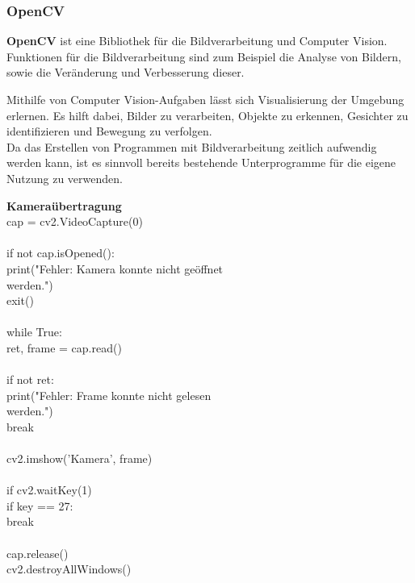 {\subsubsection{OpenCV}

\textbf{OpenCV} ist eine Bibliothek für die Bildverarbeitung und Computer Vision. Funktionen für die Bildverarbeitung sind zum Beispiel die Analyse von Bildern, sowie die Veränderung und Verbesserung dieser.

Mithilfe von Computer Vision-Aufgaben lässt sich Visualisierung der Umgebung erlernen. Es hilft dabei, Bilder zu verarbeiten, Objekte zu erkennen, Gesichter zu identifizieren und Bewegung zu verfolgen.\\
Da das Erstellen von Programmen mit Bildverarbeitung zeitlich aufwendig werden kann, ist es sinnvoll bereits bestehende Unterprogramme für die eigene Nutzung zu verwenden.\\

\newpage

\textbf{Kameraübertragung}\\

cap = cv2.VideoCapture(0)\\
\\
if not cap.isOpened():\\
print("Fehler: Kamera konnte nicht geöffnet\\ werden.")\\
exit()\\
\\
while True:\\
ret, frame = cap.read()\\
\\
if not ret:\\
print("Fehler: Frame konnte nicht gelesen\\ werden.")\\
break\\
\\
cv2.imshow('Kamera', frame)\\
\\
if cv2.waitKey(1) \\
if key == 27:\\
break\\
\\
cap.release()\\
cv2.destroyAllWindows()\\


}

